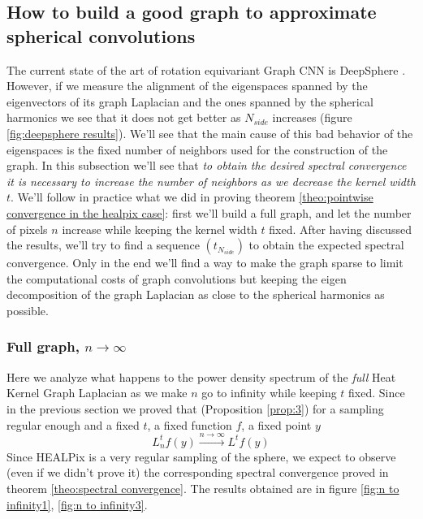 \subsection{How to build a good graph to approximate spherical convolutions}
\label{sec:Chapter2:How to build a good graph}
The current state of the art of rotation equivariant Graph CNN is DeepSphere \cite{DeepSphere}. However, if we measure the alignment of the eigenspaces spanned by the eigenvectors of its graph Laplacian and the ones spanned by the spherical harmonics we see that it does not get better as $N_{side}$ increases (figure \ref{fig:deepsphere results}). We'll see that the main cause of this bad behavior of the eigenspaces is the fixed number of neighbors used for the construction of the graph. In this subsection we'll see that \textit{to obtain the desired spectral convergence it is necessary to increase the number of neighbors as we decrease the kernel width} $t$. We'll follow in practice what we did in proving theorem \ref{theo:pointwise convergence in the healpix case}: first we'll build a full graph, and let the number of pixels $n$ increase while keeping the kernel width $t$ fixed. After having discussed the results, we'll try to find a sequence $(t_{N_{side}})$ to obtain the expected spectral convergence. Only in the end we'll find a way to make the graph sparse to limit the computational costs of graph convolutions but keeping the eigen decomposition of the graph Laplacian as close to the spherical harmonics as possible.

\subsubsection{Full graph, $n\to\infty$}\label{sec:Chapter1: n to infty}
Here we analyze what happens to the power density spectrum of the \textit{full} Heat Kernel Graph Laplacian as we make $n$ go to infinity while keeping $t$ fixed. Since in the previous section we proved that (Proposition \ref{prop:3}) for a sampling regular enough and a fixed $t$, a fixed function $f$, a fixed point $y$
$$L_n^tf(y)\xrightarrow{n\to\infty}L^tf(y)$$
Since HEALPix is a very regular sampling of the sphere, we expect to observe (even if we didn't prove it) the corresponding spectral convergence proved in theorem \ref{theo:spectral convergence}. The results obtained are in figure \ref{fig:n to infinity1}, \ref{fig:n to infinity3}.

